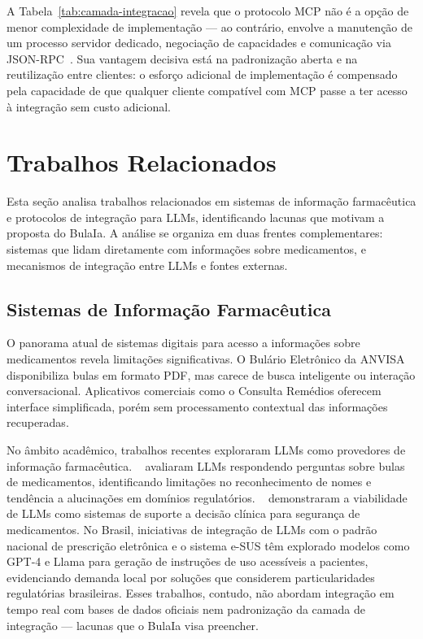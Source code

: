 \documentclass[12pt]{article}
\begin{document}
A Tabela~\ref{tab:camada-integracao} revela que o protocolo MCP não é a opção de menor complexidade de implementação --- ao contrário, envolve a manutenção de um processo servidor dedicado, negociação de capacidades e comunicação via JSON-RPC~\cite{marktechpost2025mcp}. Sua vantagem decisiva está na padronização aberta e na reutilização entre clientes: o esforço adicional de implementação é compensado pela capacidade de que qualquer cliente compatível com MCP passe a ter acesso à integração sem custo adicional.

\FloatBarrier

\section{Trabalhos Relacionados}
\label{sec:relacionados}

Esta seção analisa trabalhos relacionados em sistemas de informação farmacêutica e protocolos de integração para LLMs, identificando lacunas que motivam a proposta do BulaIa. A análise se organiza em duas frentes complementares: sistemas que lidam diretamente com informações sobre medicamentos, e mecanismos de integração entre LLMs e fontes externas.

\subsection{Sistemas de Informação Farmacêutica}

O panorama atual de sistemas digitais para acesso a informações sobre medicamentos revela limitações significativas. O Bulário Eletrônico da ANVISA~\cite{anvisa2024} disponibiliza bulas em formato PDF, mas carece de busca inteligente ou interação conversacional. Aplicativos comerciais como o Consulta Remédios oferecem interface simplificada, porém sem processamento contextual das informações recuperadas.

No âmbito acadêmico, trabalhos recentes exploraram LLMs como provedores de informação farmacêutica. \citeauthor{li2024drug}~\cite{li2024drug} avaliaram LLMs respondendo perguntas sobre bulas de medicamentos, identificando limitações no reconhecimento de nomes e tendência a alucinações em domínios regulatórios. \citeauthor{ong2024cdss}~\cite{ong2024cdss} demonstraram a viabilidade de LLMs como sistemas de suporte a decisão clínica para segurança de medicamentos. No Brasil, iniciativas de integração de LLMs com o padrão nacional de prescrição eletrônica e o sistema e-SUS têm explorado modelos como GPT-4 e Llama para geração de instruções de uso acessíveis a pacientes, evidenciando demanda local por soluções que considerem particularidades regulatórias brasileiras. Esses trabalhos, contudo, não abordam integração em tempo real com bases de dados oficiais nem padronização da camada de integração --- lacunas que o BulaIa visa preencher.
\end{document}
